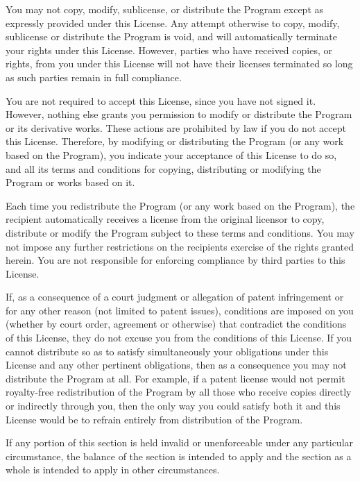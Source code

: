 \begin{DoxyEnumerate}
\item You may not copy, modify, sublicense, or distribute the Program except as expressly provided under this License. Any attempt otherwise to copy, modify, sublicense or distribute the Program is void, and will automatically terminate your rights under this License. However, parties who have received copies, or rights, from you under this License will not have their licenses terminated so long as such parties remain in full compliance.
\item You are not required to accept this License, since you have not signed it. However, nothing else grants you permission to modify or distribute the Program or its derivative works. These actions are prohibited by law if you do not accept this License. Therefore, by modifying or distributing the Program (or any work based on the Program), you indicate your acceptance of this License to do so, and all its terms and conditions for copying, distributing or modifying the Program or works based on it.
\item Each time you redistribute the Program (or any work based on the Program), the recipient automatically receives a license from the original licensor to copy, distribute or modify the Program subject to these terms and conditions. You may not impose any further restrictions on the recipients\textquotesingle{} exercise of the rights granted herein. You are not responsible for enforcing compliance by third parties to this License.
\item If, as a consequence of a court judgment or allegation of patent infringement or for any other reason (not limited to patent issues), conditions are imposed on you (whether by court order, agreement or otherwise) that contradict the conditions of this License, they do not excuse you from the conditions of this License. If you cannot distribute so as to satisfy simultaneously your obligations under this License and any other pertinent obligations, then as a consequence you may not distribute the Program at all. For example, if a patent license would not permit royalty-\/free redistribution of the Program by all those who receive copies directly or indirectly through you, then the only way you could satisfy both it and this License would be to refrain entirely from distribution of the Program.
\end{DoxyEnumerate}

If any portion of this section is held invalid or unenforceable under any particular circumstance, the balance of the section is intended to apply and the section as a whole is intended to apply in other circumstances.

